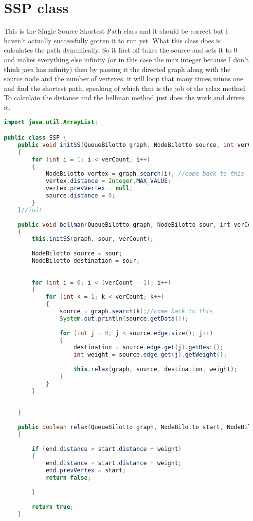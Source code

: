 \documentclass[letterpaper, 10pt]{article}
\begin{document}
\section{SSP class}
This is the Single Source Shortest Path class and it should be correct but I haven't actually successfully gotten it to run yet. What this class does is calculates the path dynamically. So it first off takes the source and sets it to 0 and makes everything else infinity (or in this case the max integer because I don't think java has infinity) then by passing it the directed graph along with the source node and the number of vertexes. it will loop that many times minus one and find the shortest path, speaking of which that is the job of the relax method. To calculate the distance and the bellman method just does the work and drives it. 
\begin{lstlisting}[language = java]
import java.util.ArrayList;

public class SSP {
	public void initSS(QueueBilotto graph, NodeBilotto source, int verCount)
	{
		for (int i = 1; i < verCount; i++)
		{
			NodeBilotto vertex = graph.search(i); //come back to this
			vertex.distance = Integer.MAX_VALUE;
			vertex.prevVertex = null;
			source.distance = 0;
		}
	}//init
	
	public void bellman(QueueBilotto graph, NodeBilotto sour, int verCount, int edgeCount)
	{
		this.initSS(graph, sour, verCount);
		
		NodeBilotto source = sour;
		NodeBilotto destination = sour;
		
		
		for (int i = 0; i < (verCount - 1); i++)
		{
			for (int k = 1; k < verCount; k++)
			{	
				source = graph.search(k);//come back to this
				System.out.println(source.getData());
				
				for (int j = 0; j < source.edge.size(); j++)
				{
					destination = source.edge.get(j).getDest();
					int weight = source.edge.get(j).getWeight();
					
					this.relax(graph, source, destination, weight);
				}
			}
		}
		
		
	}
	
	public boolean relax(QueueBilotto graph, NodeBilotto start, NodeBilotto end, int weight)
	{
		
		if (end.distance > start.distance + weight)
		{
			end.distance = start.distance + weight;
			end.prevVertex = start;
			return false;
			
		}
		
		return true;
	}
	

\end{lstlisting}
\end{document}
